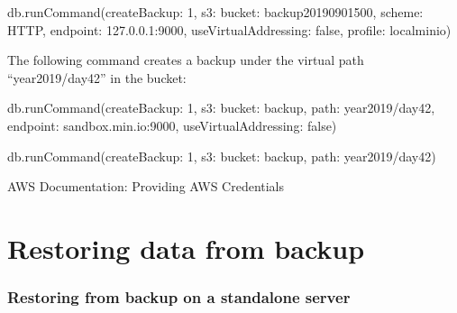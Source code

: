 \documentclass[letterpaper,10pt,english]{sphinxmanual}
\begin{document}
\begin{sphinxVerbatim}[commandchars=\\\{\}]
\PYGZgt{} db.runCommand(\PYGZob{}createBackup: 1,  s3: \PYGZob{}bucket: \PYGZdq{}backup20190901500\PYGZdq{},
scheme: \PYGZdq{}HTTP\PYGZdq{},
endpoint: \PYGZdq{}127.0.0.1:9000\PYGZdq{},
useVirtualAddressing: false,
profile: \PYGZdq{}localminio\PYGZdq{}\PYGZcb{}\PYGZcb{})
\end{sphinxVerbatim}

\sphinxAtStartPar
{}

\sphinxAtStartPar
The following command creates a backup under the virtual path  “year2019/day42” in the  bucket:

\begin{sphinxVerbatim}[commandchars=\\\{\}]
\PYGZgt{} db.runCommand(\PYGZob{}createBackup: 1,  s3: \PYGZob{}bucket: \PYGZdq{}backup\PYGZdq{},
path: \PYGZdq{}year2019/day42\PYGZdq{},
endpoint: \PYGZdq{}sandbox.min.io:9000\PYGZdq{},
useVirtualAddressing: false\PYGZcb{}\PYGZcb{})
\end{sphinxVerbatim}

\sphinxAtStartPar
{}

\begin{sphinxVerbatim}[commandchars=\\\{\}]
\PYGZgt{} db.runCommand(\PYGZob{}createBackup: 1,  s3: \PYGZob{}bucket: \PYGZdq{}backup\PYGZdq{}, path: \PYGZdq{}year2019/day42\PYGZdq{}\PYGZcb{}\PYGZcb{})
\end{sphinxVerbatim}


\nopagebreak

\begin{description}
\item[{AWS Documentation: Providing AWS Credentials}] \leavevmode
\sphinxAtStartPar
{}

\end{description}




\section{Restoring data from backup}
\label{\detokenize{hot-backup:restoring-data-from-backup}}\label{\detokenize{hot-backup:hot-backup-restore}}\subsubsection*{Restoring from backup on a standalone server}
\end{document}
